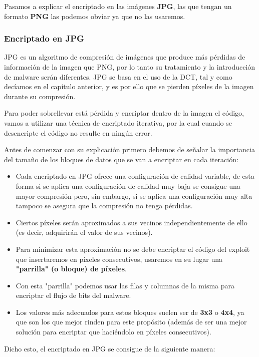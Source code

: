 Pasamos a explicar el encriptado en las imágenes \textbf{JPG}, las que tengan un formato \textbf{PNG} las podemos obviar ya que no las usaremos.

\subsubsection{Encriptado en JPG}

JPG es un algoritmo de compresión de imágenes que produce más pérdidas de información de la imagen que PNG, por lo tanto su tratamiento y la introducción de malware serán diferentes. JPG se basa en el uso de la \ac{DCT}, tal y como decíamos en el capítulo anterior, y es por ello que se pierden píxeles de la imagen durante su compresión. %

Para poder sobrellevar está pérdida y encriptar dentro de la imagen el código, vamos a utilizar una técnica de encriptado iterativa, por la cual cuando se desencripte el código no resulte en ningún error.

Antes de comenzar con su explicación primero debemos de señalar la importancia del tamaño de los bloques de datos que se van a encriptar en cada iteración: 

\begin{itemize}
\item Cada encriptado en JPG ofrece una configuración de calidad variable, de esta forma si se aplica una configuración de calidad muy baja se consigue una mayor compresión pero, sin embargo, si se aplica una configuración muy alta tampoco se asegura que la compresión no tenga pérdidas.
\item Ciertos píxeles serán aproximados a sus vecinos independientemente de ello (es decir, adquirirán el valor de sus vecinos).
\item Para minimizar esta aproximación no se debe encriptar el código del exploit que insertaremos en píxeles consecutivos, usaremos en su lugar una \textbf{"parrilla" (o bloque) de píxeles}.
\item Con esta "parrilla" podemos usar las filas y columnas de la misma para encriptar el flujo de bits del malware.
\item Los valores más adecuados para estos bloques suelen ser de \textbf{3x3} o \textbf{4x4}, ya que son los que mejor rinden para este propósito (además de ser una mejor solución para encriptar que haciéndolo en píxeles consecutivos).
\end{itemize}

Dicho esto, el encriptado en JPG se consigue de la siguiente manera:

